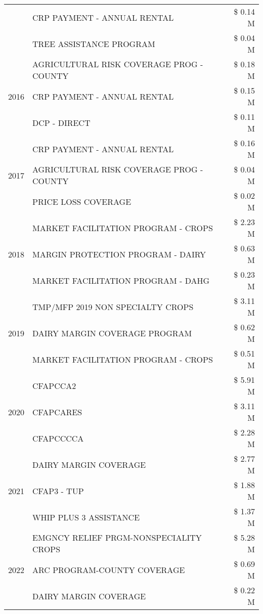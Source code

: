\begin{tabular}{llr}
 & CRP PAYMENT - ANNUAL RENTAL & \$ 0.14 M \\
 & TREE ASSISTANCE PROGRAM & \$ 0.04 M \\
\cline{1-3}
\multirow[t]{3}{*}{2016} & AGRICULTURAL RISK COVERAGE PROG - COUNTY & \$ 0.18 M \\
 & CRP PAYMENT - ANNUAL RENTAL & \$ 0.15 M \\
 & DCP - DIRECT & \$ 0.11 M \\
\cline{1-3}
\multirow[t]{3}{*}{2017} & CRP PAYMENT - ANNUAL RENTAL & \$ 0.16 M \\
 & AGRICULTURAL RISK COVERAGE PROG - COUNTY & \$ 0.04 M \\
 & PRICE LOSS COVERAGE & \$ 0.02 M \\
\cline{1-3}
\multirow[t]{3}{*}{2018} & MARKET FACILITATION PROGRAM - CROPS & \$ 2.23 M \\
 & MARGIN PROTECTION PROGRAM - DAIRY & \$ 0.63 M \\
 & MARKET FACILITATION PROGRAM - DAHG & \$ 0.23 M \\
\cline{1-3}
\multirow[t]{3}{*}{2019} & TMP/MFP 2019 NON SPECIALTY CROPS & \$ 3.11 M \\
 & DAIRY MARGIN COVERAGE PROGRAM & \$ 0.62 M \\
 & MARKET FACILITATION PROGRAM - CROPS & \$ 0.51 M \\
\cline{1-3}
\multirow[t]{3}{*}{2020} & CFAPCCA2 & \$ 5.91 M \\
 & CFAPCARES & \$ 3.11 M \\
 & CFAPCCCCA & \$ 2.28 M \\
\cline{1-3}
\multirow[t]{3}{*}{2021} & DAIRY MARGIN COVERAGE & \$ 2.77 M \\
 & CFAP3 - TUP & \$ 1.88 M \\
 & WHIP PLUS 3 ASSISTANCE & \$ 1.37 M \\
\cline{1-3}
\multirow[t]{3}{*}{2022} & EMGNCY RELIEF PRGM-NONSPECIALITY CROPS & \$ 5.28 M \\
 & ARC PROGRAM-COUNTY COVERAGE & \$ 0.69 M \\
 & DAIRY MARGIN COVERAGE & \$ 0.22 M \\
\cline{1-3}
\bottomrule
\end{tabular}
